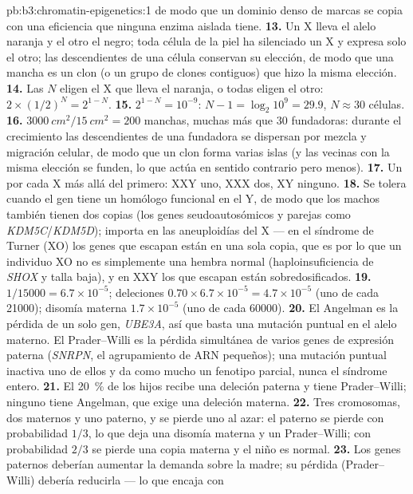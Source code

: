 \begin{solution}{pb:b3:chromatin-epigenetics:1}
de modo que un dominio denso de marcas se copia con una eficiencia que
ninguna enzima aislada tiene.
\textbf{13.} Un X lleva el alelo naranja y el otro el negro; toda célula
de la piel ha silenciado un X y expresa solo el otro; las descendientes
de una célula conservan su elección, de modo que una mancha es un clon (o
un grupo de clones contiguos) que hizo la misma elección.
\textbf{14.} Las $N$ eligen el X que lleva el naranja, o todas eligen el
otro: $2\times (1/2)^{N} = 2^{1-N}$.
\textbf{15.} $2^{1-N} = 10^{-9}$: $N - 1 = \log_{2} 10^{9} = 29.9$,
$N \approx 30$ células.
\textbf{16.} $\qty{3000}{cm^2}/\qty{15}{cm^2} = 200$ manchas, muchas más
que $30$ fundadoras: durante el crecimiento las descendientes de una
fundadora se dispersan por mezcla y migración celular, de modo que un
clon forma varias islas (y las vecinas con la misma elección se funden,
lo que actúa en sentido contrario pero menos).
\textbf{17.} Un  por cada X más allá del primero: XXY
uno, XXX dos, XY ninguno.
\textbf{18.} Se tolera cuando el gen tiene un homólogo funcional en el Y,
de modo que los machos también tienen dos copias (los genes
seudoautosómicos y parejas como \emph{KDM5C}/\emph{KDM5D}); importa en
las aneuploidías del X --- en el síndrome de Turner (XO) los genes que
escapan están en una sola copia, que es por lo que un individuo XO no es
simplemente una hembra normal (haploinsuficiencia de \emph{SHOX} y talla
baja), y en XXY los que escapan están sobredosificados.
\textbf{19.} $1/\num{15000} = 6.7\times 10^{-5}$; deleciones $0.70\times
6.7\times 10^{-5} = 4.7\times 10^{-5}$ (uno de cada \num{21000});
disomía materna $1.7\times 10^{-5}$ (uno de cada \num{60000}).
\textbf{20.} El Angelman es la pérdida de un solo gen, \emph{UBE3A}, así
que basta una mutación puntual en el alelo materno. El Prader--Willi es
la pérdida simultánea de varios genes de expresión paterna
(\emph{SNRPN}, el agrupamiento de ARN pequeños); una mutación puntual
inactiva uno de ellos y da como mucho un fenotipo parcial, nunca el
síndrome entero.
\textbf{21.} El \qty{20}{\%} de los hijos recibe una deleción paterna y
tiene Prader--Willi; ninguno tiene Angelman, que exige una deleción
materna.
\textbf{22.} Tres cromosomas, dos maternos y uno paterno, y se pierde uno
al azar: el paterno se pierde con probabilidad $1/3$, lo que deja una
disomía materna y un Prader--Willi; con probabilidad $2/3$ se pierde una
copia materna y el niño es normal.
\textbf{23.} Los genes paternos deberían aumentar la demanda sobre la
madre; su pérdida (Prader--Willi) debería reducirla --- lo que encaja con

\end{solution}
